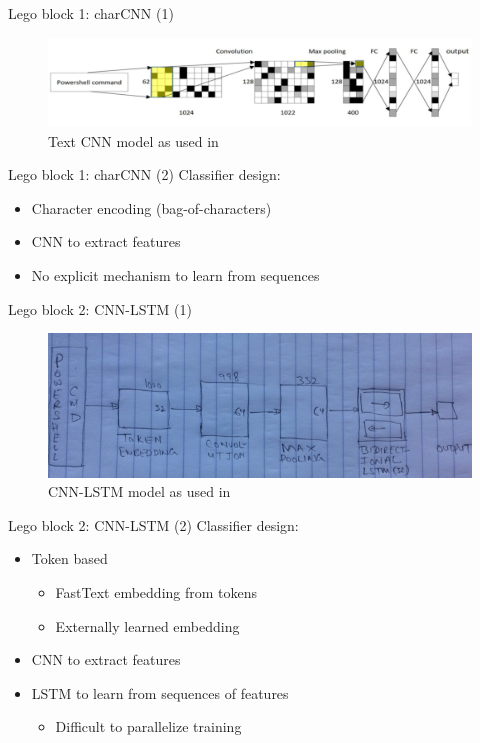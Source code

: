 \documentclass[10pt]{beamer}
\begin{document}
\begin{frame}{Lego block 1: charCNN (1)}
	\begin{figure}
		\includegraphics[scale=0.28]{charcnn}
		\caption{Text CNN model as used in \cite{powershell2018}}
	\end{figure}
\end{frame}

\begin{frame}{Lego block 1: charCNN (2)}
	Classifier design:
	\begin{itemize}
		\item Character encoding (bag-of-characters)
		\item CNN to extract features
		\item No explicit mechanism to learn from sequences
	\end{itemize}
\end{frame}

\begin{frame}{Lego block 2: CNN-LSTM (1)}
	\begin{figure}
		\includegraphics[scale=0.50]{cnn-lstm}
		\caption{CNN-LSTM model as used in \cite{amsi2019}}
	\end{figure}
\end{frame}

\begin{frame}{Lego block 2: CNN-LSTM (2)}
	Classifier design:
	\begin{itemize}
		\item Token based
		\begin{itemize}
			\item FastText embedding from tokens
			\item Externally learned embedding
		\end{itemize}
		\item CNN to extract features
		\item LSTM to learn from sequences of features
		\begin{itemize}
			\item Difficult to parallelize training
		\end{itemize}
	\end{itemize}
\end{frame}
\end{document}
